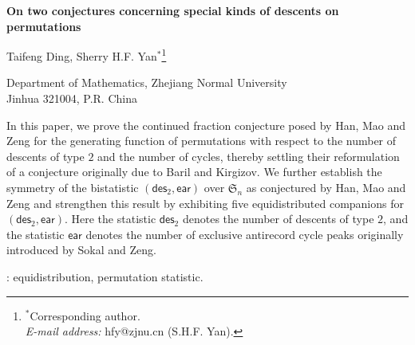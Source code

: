 \documentclass[12pt]{article}
\numberwithin{equation}{section}
\theoremstyle{plain}
\def\des{\mathsf{des}}
\def\ear{\mathsf{ear}}
\begin{document}
	\begin{center}
		{\Large\bf On two conjectures concerning  special kinds of descents on permutations}
	\end{center}
	
	\begin{center}
		
		{\small Taifeng Ding, 
			Sherry H.F. Yan$^{*}$\footnote{$^*$Corresponding author. \\{\em E-mail address:}   hfy@zjnu.cn (S.H.F. Yan). }} 
		
		 Department of Mathematics,
		Zhejiang Normal University\\
		Jinhua 321004, P.R. China
		
	 
		
		
		
	\end{center}
	
	
	
	
	
	
	
In this paper, we prove the continued fraction conjecture posed by Han, Mao and Zeng for the generating function of permutations with respect to the number of descents of type $2$ and the number of cycles, thereby settling their reformulation of a conjecture originally due to Baril and Kirgizov. We further establish the symmetry of the bistatistic $(\des_2, \ear)$ over $\mathfrak{S}_n$ as conjectured by Han, Mao and Zeng and strengthen this result by exhibiting  five equidistributed companions for $(\des_2, \ear)$. Here the statistic $\des_2$ denotes the number of descents of type $2$, and  the statistic $\ear$ denotes the number of exclusive antirecord cycle peaks originally introduced by Sokal and Zeng.
	
	
	
	:  equidistribution, permutation statistic. 
	
	
	
	
	
	
	
\end{document}
